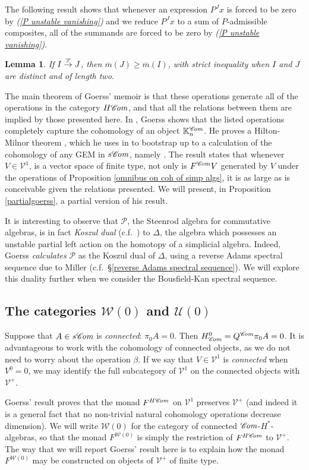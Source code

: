 \documentclass[11pt]{amsart} \renewcommand{\baselinestretch}{1.2}
\theoremstyle{plain}
\newtheorem{lem}[thm]{Lemma}
\numberwithin{equation}{section} %
\theoremstyle{plain}
\newtheorem{lem}[thm]{Lemma}
\numberwithin{equation}{chapter} %
\newcommand{\scrC}{\mathscr{C}}
\newcommand{\calU}{\mathcal{U}}
\newcommand{\calP}{\mathcal{P}}
\newcommand{\calV}{\mathcal{V}}
\newcommand{\calw}{\mathcal{W}}
\newcommand{\citeBOX}[2][]{\cite[\mbox{#1}]{#2}}
\newcommand{\Palg}{{\calP}}
\newcommand{\deltaalg}{\Delta} %
\newcommand{\vect}[2]{\calV^{#1}_{#2}}
\newcommand{\HA}[1]{H#1}
\newcommand{\minDimP}{\overline{m}}
\newcommand{\produces}[3]{#3:#1\sim #2}
\renewcommand{\produces}[3]{#1\rightarrow_{#3} #2}%
\renewcommand{\produces}[3]{#1\overset{\smash{#3}}{\rightarrow} #2}%
\newcommand{\algs}{{\scrC\!\textit{\normalfont\textit{om}}}}
\newcommand{\SubsectionOrSection}[1]{\subsection{#1}}
\begin{document}
\begin{Constructing cohomology operations}
The following result shows that whenever an expression $P^Jx$ is forced to be zero by \emph{(\ref{P unstable vanishing})}  and we reduce $P^Jx$ to a sum of $P$-admissible composites, all of the summands are forced to be zero by \emph{(\ref{P unstable vanishing})}.
\begin{lem}
\label{lemOnAdemChangeInMP}
If $\produces{I}{J}{\Palg}$, then $\minDimP(J) \geq \minDimP(I)$, with strict inequality when $I$ and $J$ are distinct and of length two.
\end{lem}
The main theorem of Goerss' memoir is that these operations generate all of the operations in the category $\HA{\algs}$, and that all  the relations between them  are implied by those presented here. In \cite[Chapter V]{MR1089001}, Goerss shows that the listed operations completely capture the cohomology of an object $\mathbb{K}_n^{\algs}$. He proves a Hilton-Milnor theorem \cite{GoerssHiltonMilnor.pdf}, which he uses in \citeBOX[\S11]{MR1089001} to bootstrap up to a calculation of the cohomology of any GEM in $s\algs$, namely \cite[Theorem I]{MR1089001}. The result states that whenever $V\in \vect{1}{}$,  is a  vector space of finite type, not only is 
$F^{\algs}V$
generated by $V$ under the operations of Proposition \ref{omnibus on coh of simp algs}, it is as large as is conceivable given the relations presented. We will present, in Proposition \ref{partialgoerss}, a partial version of his result.

It is  interesting to observe that $\Palg$, the Steenrod algebra for commutative algebras, is
in fact \emph{Koszul dual} (c.f.\ \cite{PriddyKoszul.pdf}) to $\deltaalg$, the algebra which possesses an unstable partial left action on the homotopy of a simplicial algebra. Indeed, Goerss \emph{calculates} $\Palg$ as the Koszul dual of $\deltaalg$, using a reverse Adams spectral sequence due to Miller \cite{MillerSullivanConjecture.pdf} (c.f.\ \S\ref{reverse Adams spectral sequence}). We will explore this duality further when we consider the Bousfield-Kan spectral sequence.

\SubsectionOrSection{The categories $\calw(0)$ and $\calU(0)$}
Suppose that $A\in s\algs$ is \emph{connected}: $\pi_0A=0$. Then $H^0_{\algs}=Q^{\algs}\pi_0A=0$. It is advantageous to work with the cohomology of connected objects, as we do not need to worry about the operation $\beta$. If we say that $V\in \vect{1}{}$ is \emph{connected} when $V^{0}=0$, we may identify the full subcategory of $\vect{1}{}$ on the connected objects with $\vect{+}{}$.

Goerss' result proves that the monad
$F^{\HA{\algs}}$ on $\vect{1}{}$
preserves $\vect{+}{}$ (and indeed it is a general fact that no non-trivial natural cohomology operations decrease dimension).
We will write $\calw(0)$ for the category of connected $\algs$-$H^*$-algebras, so that the monad $F^{\calw(0)}$  is simply the restriction of $F^{\HA{\algs}}$ to $\vect{+}{}$. The way that we will report Goerss' result here is to explain how the monad $F^{\calw(0)}$ may be constructed on objects of $\vect{+}{}$ of finite type.


\end{Constructing cohomology operations}
\end{document}
